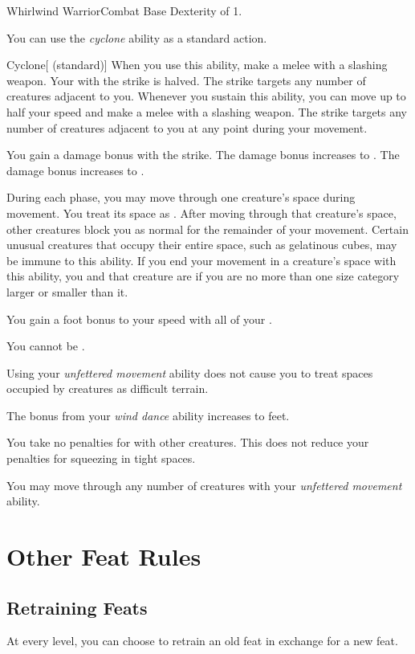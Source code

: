     \begin{feat}{Whirlwind Warrior}{Combat}
        \featpre Base Dexterity of 1.

         You can use the \textit{cyclone} ability as a standard action.
        \begin{freeability}{Cyclone}[ (standard)]
            When you use this ability, make a melee  with a slashing weapon.
            Your  with the strike is halved.
            The strike targets any number of creatures adjacent to you.
            Whenever you sustain this ability, you can move up to half your speed and make a melee  with a slashing weapon.
            The strike targets any number of creatures adjacent to you at any point during your movement.

            \rankline
             You gain a  damage bonus with the strike.
             The damage bonus increases to .
             The damage bonus increases to .
        \end{freeability}

         During each phase, you may move through one creature's space during movement.
        You treat its space as .
        After moving through that creature's space, other creatures block you as normal for the remainder of your movement.
        Certain unusual creatures that occupy their entire space, such as gelatinous cubes, may be immune to this ability.
        If you end your movement in a creature's space with this ability, you and that creature are  if you are no more than one size category larger or smaller than it.

         You gain a  foot bonus to your speed with all of your .

         You cannot be \surrounded.

         Using your \textit{unfettered movement} ability does not cause you to treat spaces occupied by creatures as difficult terrain.

         The bonus from your \textit{wind dance} ability increases to  feet.

         You take no penalties for  with other creatures.
        This does not reduce your penalties for squeezing in tight spaces.

         You may move through any number of creatures with your \textit{unfettered movement} ability.
    \end{feat}

\section{Other Feat Rules}

    \subsection{Retraining Feats}
        At every level, you can choose to retrain an old feat in exchange for a new feat.
